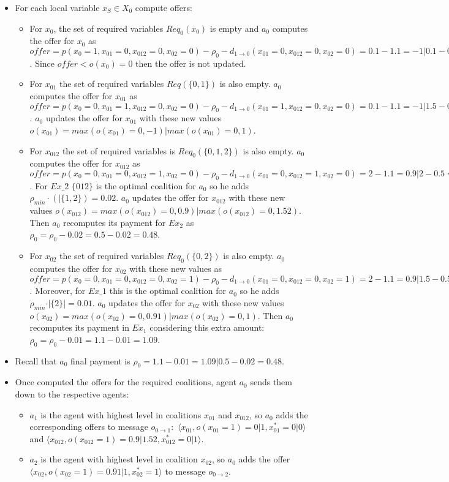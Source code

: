 \documentclass{article}
\begin{document}
\begin{itemize}
\item For each local variable $x_S\in X_0$ compute offers:
 \begin{itemize}
   \item For $x_0$, the set of required variables $Req_0(x_0)$ is empty and
   $a_0$ computes the offer for $x_0$ as
   $offer=p(x_{0}=1,x_{01}=0,x_{012}=0,x_{02}=0) -\rho_0- d_{1\rightarrow
   0}(x_{01}=0,x_{012}=0,x_{02}=0)= 0.1 -1.1 =-1\vert 0.1 - 0.5 = -0.4$. Since
  $offer < o(x_0)=0$ then the offer is not updated.
	\item For $x_{01}$ the set of required variables $Req(\{0,1\})$ is also empty.
	$a_0$ computes the offer for $x_{01}$ as
	$offer=p(x_{0}=0,x_{01}=1,x_{012}=0,x_{02}=0) -\rho_0- d_{1\rightarrow 0}(x_{01}=1,x_{012}=0,x_{02}=0)
=0.1 -1.1  = -1 \vert 1.5-0.5  =1$. $a_0$ 
	updates the offer for $x_{01}$ with these new values
	$o(x_{01})=max(o(x_{01})=0, -1)\vert max(o(x_{01})=0, 1)$.
	\item For $x_{012}$ the set of required variables is
$Req_0(\{0,1,2\})$ is also empty. $a_0$ computes the offer for $x_{012}$ as
$offer=p(x_{0}=0,x_{01}=0,x_{012}=1,x_{02}=0) -\rho_0- d_{1\rightarrow
0}(x_{01}=0,x_{012}=1,x_{02}=0) =2 -1.1 = 0.9 \vert 2-0.5 =1.5$. For $Ex\_2$
$\{012\}$ is the optimal coalition for $a_0$ so he adds $\rho_{min}\cdot (\vert
\{1,2\})= 0.02$. $a_0$ 
	updates the offer for $x_{012}$ with these new values
	$o(x_{012})=max(o(x_{012})=0, 0.9)\vert max(o(x_{012})=0, 1.52)$.
Then $a_0$ recomputes its payment for $Ex_2$ as
$\rho_0=\rho_0-0.02=0.5-0.02=0.48$.
	\item For $x_{02}$ the set of required variables 
	$Req_0(\{0,2\})$ is also empty. $a_0$ computes the offer for $x_{02}$ with
	these new values as
	$offer=p(x_{0}=0,x_{01}=0,x_{012}=0,x_{02}=1) -\rho_0- d_{1\rightarrow 0}(x_{01}=0,x_{012}=0,x_{02}=1)
	=2 -1.1 = 0.9 \vert 1.5-0.5   =1$. Moreover,
	for $Ex\_1$ this is the optimal coalition for $a_0$ so he adds $\rho_{min}\cdot \vert \{2\} \vert
	= 0.01$. 
	$a_0$ updates the offer for $x_{02}$ with these new values
	$o(x_{02})=max(o(x_{02})=0, 0.91)\vert max(o(x_{02})=0, 1)$.
	Then $a_0$
	recomputes its payment in $Ex_1$ considering this extra amount:
	$\rho_0=\rho_0-0.01=1.1-0.01=1.09$.
 \end{itemize}
\item  Recall that $a_0$ final payment is $\rho_0  =
1.1 - 0.01 = 1.09 \vert 0.5-0.02 =0.48.$
\item Once computed the offers for the required coalitions, agent $a_0$ sends
them down to the respective agents:
\begin{itemize}
\item $a_1$ is the agent with highest level in coalitions $x_{01}$ and
$x_{012}$, so $a_0$ adds the corresponding offers to  message $o_{0\rightarrow
1}:$ $\langle x_{01}, o(x_{01}=1) = 0\vert 1, x^*_{01}=0\vert 0 \rangle$ and
$\langle x_{012}, o(x_{012}=1) = 0.9\vert 1.52, x^*_{012}=0\vert 1 \rangle$.
\item $a_2$ is the agent with highest level in coalition $x_{02}$, so $a_0$ adds
the offer $\langle x_{02},o(x_{02}=1) = 0.91\vert 1, x^*_{02}=1 \rangle$ to 
message $o_{0\rightarrow 2}$.
\end{itemize}
  

\end{itemize}
\end{document}
